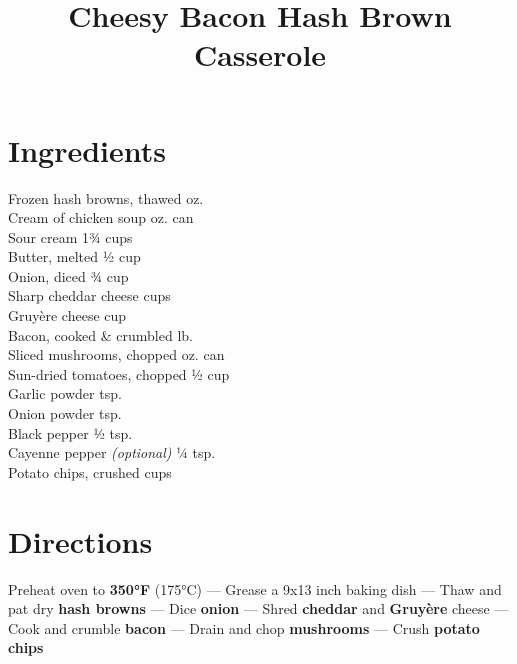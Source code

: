 \documentclass[11pt,letterpaper]{article}
\title{Cheesy Bacon Hash Brown Casserole}
\author{}
\date{}
\begin{document}
\maketitle
\thispagestyle{empty}

\section*{Ingredients}
\setlength{\columnsep}{20pt}
\begin{multicols}{2}
\noindent
    Frozen hash browns, thawed  oz. \\
    Cream of chicken soup  oz. can \\
    Sour cream \dotfill 1¾ cups \\
    Butter, melted \dotfill ½ cup \\
    Onion, diced \dotfill ¾ cup \\
    Sharp cheddar cheese  cups \\
    Gruyère cheese  cup \\
	\columnbreak
    Bacon, cooked \& crumbled  lb. \\
    Sliced mushrooms, chopped  oz. can \\
    Sun-dried tomatoes, chopped \dotfill ½ cup \\
    Garlic powder  tsp. \\
    Onion powder  tsp. \\
    Black pepper \dotfill ½ tsp. \\
    Cayenne pepper \textit{(optional)} \dotfill ¼ tsp. \\
    Potato chips, crushed  cups \\
\end{multicols}

\section*{Directions}

\noindent
Preheat oven to \textbf{350°F} (175°C) ---
Grease a 9x13 inch baking dish ---
Thaw and pat dry \textbf{hash browns} ---
Dice \textbf{onion} ---
Shred \textbf{cheddar} and \textbf{Gruyère} cheese ---
Cook and crumble \textbf{bacon} ---
Drain and chop \textbf{mushrooms} ---
Crush \textbf{potato chips}
\end{document}
